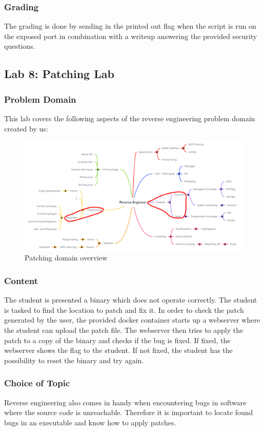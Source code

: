 \subsubsection*{Grading}
The grading is done by sending in the printed out flag when the script is run on the exposed port in combination with a writeup answering the provided security questions.
\pagebreak

\subsection{Lab 8: Patching Lab}
\subsubsection*{Problem Domain}
This lab covers the following aspects of the reverse engineering problem domain created by us:
\vspace{-2ex}
\begin{figure}[H]
    \includegraphics[width=\textwidth]{resources/patching-overview-light.png}
    \caption{Patching domain overview}
    \label{fig:patching-overview}
\end{figure}
\subsubsection*{Content}
The student is presented a binary which does not operate correctly. The student is tasked to find the location to patch and fix it. In order to check the patch generated by the user, the provided docker container starts up a webserver where the student can upload the patch file. The webserver then tries to apply the patch to a copy of the binary and checks if the bug is fixed. If fixed, the webserver shows the flag to the student. If not fixed, the student has the possibility to reset the binary and try again.

\subsubsection*{Choice of Topic}
Reverse engineering also comes in handy when encountering bugs in software where the source code is unreachable. Therefore it is important to locate found bugs in an executable and know how to apply patches.
